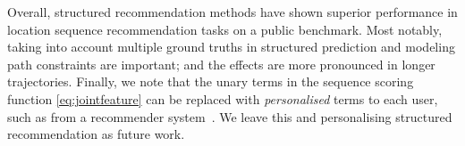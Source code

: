 Overall, structured recommendation methods have shown superior performance in location sequence recommendation tasks on a public benchmark. Most notably, taking into account multiple ground truths in structured prediction and modeling path constraints are important; and the effects are more pronounced in longer trajectories.
Finally, we note that the unary terms in the sequence scoring function \eqref{eq:jointfeature} can be replaced with {\em personalised} terms to each user, such as from a recommender system~\cite{Koren:2009,bpr09}. We leave this and personalising structured recommendation
as future work.


